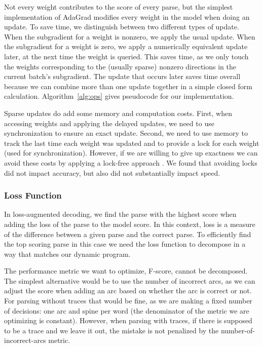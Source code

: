 Not every weight contributes to the score of every parse, but the simplest implementation of AdaGrad modifies every weight in the model when doing an update.
To save time, we distinguish between two different types of update.
When the subgradient for a weight is nonzero, we apply the usual update.
When the subgradient for a weight is zero, we apply a numerically equivalent update later, at the next time the weight is queried.
This saves time, as we only touch the weights corresponding to the (usually sparse) nonzero directions in the current batch's subgradient.
The update that occurs later saves time overall because we can combine more than one update together in a simple closed form calculation.
Algorithm~\ref{alg:ops} gives pseudocode for our implementation.

Sparse updates do add some memory and computation costs.
First, when accessing weights and applying the delayed updates, we need to use synchronization to ensure an exact update.
Second, we need to use memory to track the last time each weight was updated and to provide a lock for each weight (used for synchronization).
However, if we are willing to give up exactness we can avoid these costs by applying a lock-free approach \parencite{hogwild}.
We found that avoiding locks did not impact accuracy, but also did not substantially impact speed.


\subsubsection{Loss Function}

In loss-augmented decoding, we find the parse with the highest score when adding the loss of the parse to the model score.
In this context, loss is a measure of the difference between a given parse and the correct parse.
To efficiently find the top scoring parse in this case we need the loss function to decompose in a way that matches our dynamic program.

The performance metric we want to optimize, F-score, cannot be decomposed.
The simplest alternative would be to use the number of incorrect arcs, as we can adjust the score when adding an arc based on whether the arc is correct or not.
For parsing without traces that would be fine, as we are making a fixed number of decisions: one arc and spine per word (\myie the denominator of the metric we are optimizing is constant).
However, when parsing with traces, if there is supposed to be a trace and we leave it out, the mistake is not penalized by the number-of-incorrect-arcs metric.

